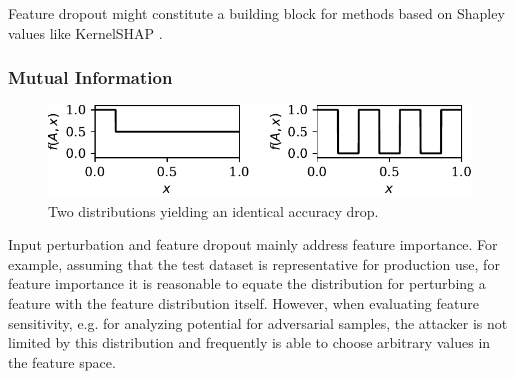 \documentclass[conference]{IEEEtran}
\begin{document}
Feature dropout might constitute a building block for methods based on Shapley values \cite{shapley_value_1953} like KernelSHAP \cite{lundberg_unified_2017}. 
\subsubsection{Mutual Information}
\begin{figure}
\includegraphics[width=\columnwidth]{../plots/mutinfo_example.pdf}
\caption{Two distributions yielding an identical accuracy drop.}
\label{fig:mutinfo_example}
\end{figure}
Input perturbation and feature dropout mainly address feature importance.
For example, assuming that the test dataset is representative for production use, for feature importance it is reasonable to equate the distribution for perturbing a feature with the feature distribution itself. However, when evaluating feature sensitivity, e.g. for analyzing potential for adversarial samples, the attacker is not limited by this distribution and frequently is able to choose arbitrary values in the feature space.
\end{document}
